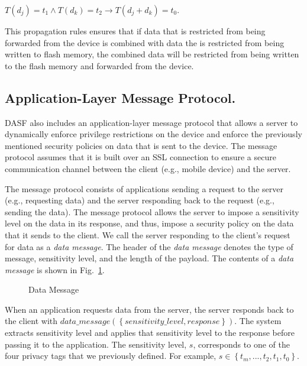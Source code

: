 $T\left(d_{j}\right) = t_1 \wedge T\left(d_{k}\right) = t_2 \to T\left(d_{j}+d_{k}\right) = t_0$.

This propagation rules ensures that if data that is restricted from
being forwarded from the device is combined with data the is restricted
from being written to flash memory, the combined data will be restricted
from being written to the flash memory and forwarded from the device.

\subsection{Application-Layer Message Protocol.}   
DASF also includes an application-layer message protocol
that allows a server to dynamically enforce privilege restrictions
on the device and enforce the previously mentioned security policies
on data that is sent to the device.  The message
protocol assumes that it is built over an SSL connection to ensure
a secure communication channel between the client (e.g., mobile
device) and the server.

The message protocol consists of applications sending a request to
the server (e.g., requesting data) and the server responding back
to the request (e.g., sending the data).  The message protocol
allows the server to impose a sensitivity level on the data in
its response, and thus, impose a security policy on the data that
it sends to the client.  We call the server responding to the
client's request for data as a \textit{data message}.
The header of the \textit{data message} denotes the type of message,
sensitivity level, and the length of the payload.  The contents of a
\textit{data message} is shown in Fig.~\ref{fig:datamessage}.

\begin{figure}[ht]
\centering
{}
\caption{Data Message}
\label{fig:datamessage}
\end{figure}


When an application requests data from the server, the server
responds back to the client with
$data\_message\left(\left\{sensitivity\_level, response\right\}\right)$.
The system extracts sensitivity level and applies that sensitivity level
to the response before passing it to the application.  The sensitivity
level, $s$, corresponds to one of the four privacy tags that we previously defined.
For example,  $s \in \left\{t_m,..., t_2, t_1, t_0\right\}$.

